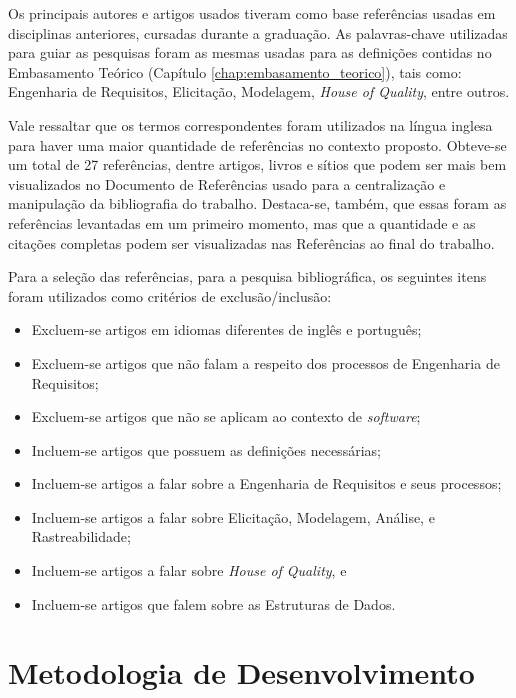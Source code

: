 Os principais autores e artigos usados tiveram como base referências usadas em disciplinas anteriores, cursadas durante a graduação. As palavras-chave utilizadas para guiar as pesquisas foram as mesmas usadas para as definições contidas no Embasamento Teórico (Capítulo \ref{chap:embasamento_teorico}), tais como: Engenharia de Requisitos, Elicitação, Modelagem, \textit{House of Quality}, entre outros.

Vale ressaltar que os termos correspondentes foram utilizados na língua inglesa para haver uma maior quantidade de referências no contexto proposto. Obteve-se um total de 27 referências, dentre artigos, livros e sítios que podem ser mais bem visualizados no Documento de Referências \cite{referencias_iflow} usado para a centralização e manipulação da bibliografia do trabalho. Destaca-se, também, que essas foram as referências levantadas em um primeiro momento, mas que a quantidade e as citações completas podem ser visualizadas nas Referências ao final do trabalho.

Para a seleção das referências, para a pesquisa bibliográfica, os seguintes itens foram utilizados como critérios de exclusão/inclusão:

\begin{itemize}
    \item Excluem-se artigos em idiomas diferentes de inglês e português;
    \item Excluem-se artigos que não falam a respeito dos processos de Engenharia de Requisitos;
    \item Excluem-se artigos que não se aplicam ao contexto de \textit{software};
    \item Incluem-se artigos que possuem as definições necessárias;
    \item Incluem-se artigos a falar sobre a Engenharia de Requisitos e seus processos;
    \item Incluem-se artigos a falar sobre Elicitação, Modelagem, Análise, e Rastreabilidade;
    \item Incluem-se artigos a falar sobre \textit{House of Quality}, e
    \item Incluem-se artigos que falem sobre as Estruturas de Dados.
\end{itemize}

\section{Metodologia de Desenvolvimento}

\label{sec:metodologia_desenvolvimento}

